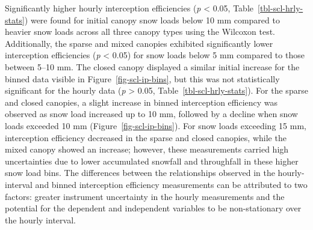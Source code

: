 \documentclass[
  letterpaper,
]{tex/uofsthesis-cs}
\begin{document}
\pagebreak

Significantly higher hourly interception efficiencies (\emph{p}
\textless{} 0.05, Table~\ref{tbl-scl-hrly-stats}) were found for initial
canopy snow loads below 10 mm compared to heavier snow loads across all
three canopy types using the Wilcoxon test. Additionally, the sparse and
mixed canopies exhibited significantly lower interception efficiencies
(\emph{p} \textless{} 0.05) for snow loads below 5 mm compared to those
between 5--10 mm. The closed canopy displayed a similar initial increase
for the binned data visible in Figure~\ref{fig-scl-ip-bins}, but this
was not statistically significant for the hourly data (\emph{p}
\textgreater{} 0.05, Table~\ref{tbl-scl-hrly-stats}). For the sparse and
closed canopies, a slight increase in binned interception efficiency was
observed as snow load increased up to 10 mm, followed by a decline when
snow loads exceeded 10 mm (Figure~\ref{fig-scl-ip-bins}). For snow loads
exceeding 15 mm, interception efficiency decreased in the sparse and
closed canopies, while the mixed canopy showed an increase; however,
these measurements carried high uncertainties due to lower accumulated
snowfall and throughfall in these higher snow load bins. The differences
between the relationships observed in the hourly-interval and binned
interception efficiency measurements can be attributed to two factors:
greater instrument uncertainty in the hourly measurements and the
potential for the dependent and independent variables to be
non-stationary over the hourly interval.
\end{document}
